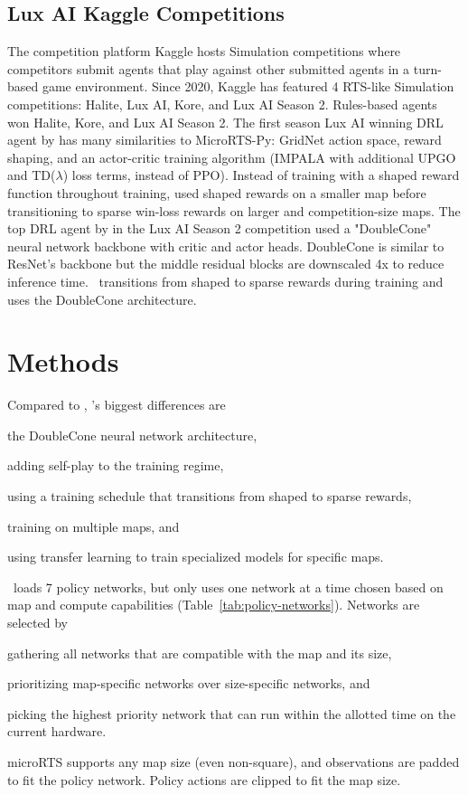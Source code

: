 \documentclass[conference]{IEEEtran}
\begin{document}
\subsection{Lux AI Kaggle Competitions}
The competition platform Kaggle hosts Simulation competitions where competitors submit
agents that play against other submitted agents in a turn-based game environment. Since
2020, Kaggle has featured 4 RTS-like Simulation competitions: Halite, Lux AI, Kore, and
Lux AI Season 2. Rules-based agents won Halite, Kore, and Lux AI Season 2. The first
season Lux AI winning DRL agent by \cite{lux-ai-2021-winner} has many similarities to
MicroRTS-Py: GridNet action space, reward shaping, and an actor-critic training
algorithm (IMPALA with additional UPGO and TD($\lambda$) loss terms, instead of PPO).
Instead of training with a shaped reward function throughout training,
\cite{lux-ai-2021-winner} used shaped rewards on a smaller map before transitioning to
sparse win-loss rewards on larger and competition-size maps. The top DRL agent by
\cite{Ferdinand2021doublecone} in the Lux AI Season 2 competition used a "DoubleCone"
neural network backbone with critic and actor heads. DoubleCone is similar to ResNet's
backbone but the middle residual blocks are downscaled 4x to reduce inference time.
\agentName\ transitions from shaped to sparse rewards during training and uses the
DoubleCone architecture.


\section{Methods}
\label{sec:methods}

Compared to \cite{DBLP:journals/corr/abs-2105-13807}, \agentName's biggest differences
are 
\begin{inparaenum}[(1)]
    \item the DoubleCone neural network architecture,
    \item adding self-play to the training regime,
    \item using a training schedule that transitions from shaped to sparse rewards,
    \item training on multiple maps, and
    \item using transfer learning to train specialized models for specific maps.
\end{inparaenum}
\agentName\ loads 7 policy networks, but only uses one network at a time chosen based
on map and compute capabilities (Table~\ref{tab:policy-networks}).
Networks are selected by
\begin{inparaenum}[(1)]
    \item gathering all networks that are compatible with the map and its size,
    \item prioritizing map-specific networks over size-specific networks, and
    \item picking the highest priority network that can run within the allotted time on
    the current hardware.
\end{inparaenum}
microRTS supports any map size (even non-square), and observations are padded to fit the
policy network. Policy actions are clipped to fit the map size.
\end{document}
